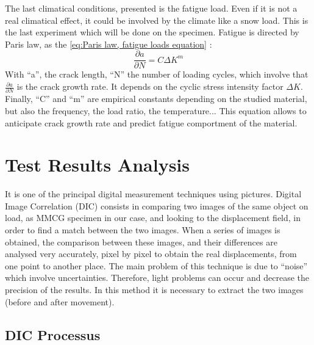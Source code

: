 The last climatical conditions, presented is the fatigue load. Even if it is not a real climatical effect, it could be involved by the climate like a snow load. This is the last experiment which will be done on the specimen. Fatigue is directed by Paris law, as the \ref{eq:Paris law, fatigue loads equation} :
\begin{equation}
	\frac{\partial a}{\partial N}=C \Delta K^{m}
	\label{eq:Paris law, fatigue loads equation}
\end{equation} 
With “a”, the crack length, “N” the number of loading cycles, which involve that $\frac{\partial a}{\partial N}$ is the crack growth rate. It depends on the cyclic stress intensity factor $\Delta K$. Finally, “C” and “m” are empirical constants depending on the studied material, but also the frequency, the load ratio, the temperature... This equation allows to anticipate crack growth rate and predict fatigue comportment of the material. 



\section{Test Results Analysis}

It is one of the principal digital measurement techniques using pictures. Digital Image Correlation (DIC) consists in comparing two images of the same object on load, as MMCG specimen in our case, and looking to the displacement field, in order to find a match between the two images. When a series of images is obtained, the comparison between these images, and their differences are analysed very accurately, pixel by pixel to obtain the real displacements, from one point to another place. The main problem of this technique is due to “noise” which involve uncertainties. Therefore, light problems can occur and decrease the precision of the results. In this method it is necessary to extract the two images (before and after movement).


\subsection{DIC Processus}


